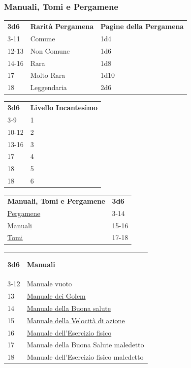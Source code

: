 \begin{multicols}{2}
{\subsubsection{Manuali, Tomi e Pergamene}\hypertarget{manualitomi}{}\label{manualitomi}\label{CPergamene}\hypertarget{CPergamene}{}

{\small \begin{tabularx}{0.48\textwidth}{lll}
\textbf{3d6} & \textbf{Rarità Pergamena} & \textbf{Pagine della Pergamena}\\
3-11 &Comune & 1d4 \\
12-13 &Non Comune & 1d6 \\
14-16 &Rara & 1d8 \\
17 & Molto Rara & 1d10\\
18 & Leggendaria & 2d6\\
\end{tabularx}}

\medskip

{\small \begin{tabularx}{0.48\textwidth}{ll}
	\textbf{3d6} & \textbf{Livello Incantesimo}\\
	3-9 & 1 \\
	10-12 & 2 \\
	13-16 & 3  \\
	17 & 4  \\
	18 & 5 \\
	18 & 6 \\
\end{tabularx}}

\medskip

{\small\begin{tabularx}{0.45\textwidth}{lX}
		\textbf{Manuali, Tomi e Pergamene}&\textbf{3d6}\\
		\hyperlink{manualitomi}{Pergamene} &3-14\\
		\hyperlink{manualitomi}{Manuali} &15-16\\
		\hyperlink{manualitomi}{Tomi} &17-18
\end{tabularx}}

\medskip

\begin{tabularx}{0.45\textwidth}{lX}\hypertarget{Manuali}{}
\textbf{3d6} & \textbf{Manuali}\\
3-12 & Manuale vuoto\\
13 & \hyperlink{ManualedeiGolem}{Manuale dei Golem}\\
14 & \hyperlink{ManualedellaBuonasalute}{Manuale della Buona salute}\\
15 & \hyperlink{ManualedellaVelocitàdiazione}{Manuale della Velocità di azione}\\
16 & \hyperlink{Manualedell'Eserciziofisico}{Manuale dell'Esercizio fisico}\\
17 & Manuale della Buona Salute maledetto\\
18 & Manuale dell'Esercizio fisico maledetto
\end{tabularx}

}
\end{multicols}
